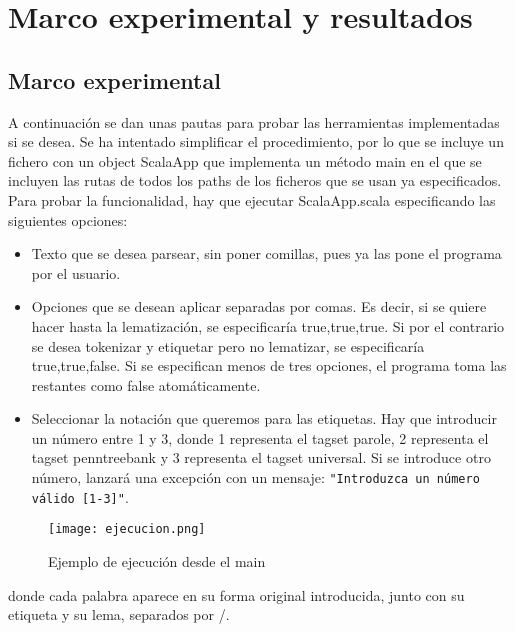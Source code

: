 \chapter{Marco experimental y resultados}
\label{conclusion}

\section{Marco experimental} 
A continuación se dan unas pautas para probar las herramientas implementadas si se desea. Se ha intentado simplificar el procedimiento, por lo que se incluye un fichero con un object \textsf{ScalaApp} que implementa un método main en el que se incluyen las rutas de todos los paths de los ficheros que se usan ya especificados. 
Para probar la funcionalidad, hay que ejecutar \textcolor{SchoolColor}{ScalaApp.scala} especificando las siguientes opciones:
\begin{itemize}
\item Texto que se desea parsear, sin poner comillas, pues ya las pone el programa por el usuario.
\item Opciones que se desean aplicar separadas por comas. Es decir, si se quiere hacer hasta la lematización, se especificaría \textsf{true,true,true}. Si por el contrario se desea tokenizar y etiquetar pero no lematizar, se especificaría  \textsf{true,true,false}. Si se especifican menos de tres opciones, el programa toma las restantes como false atomáticamente.
\item Seleccionar la notación que queremos para las etiquetas. Hay que introducir un número entre 1 y 3, donde 1 representa el tagset parole, 2 representa el tagset penntreebank y 3 representa el tagset universal. Si se introduce otro número, lanzará una excepción con un mensaje: \texttt{"Introduzca un número válido [1-3]"}. 
\end{itemize}

\begin{figure}[H]%
\centering
\texttt{[image: ejecucion.png]}  %
\label{}
\caption{Ejemplo de ejecución desde el main}   
\end{figure}

donde cada palabra aparece en su forma original introducida, junto con su etiqueta y su lema, separados por \textsf{/}. 
